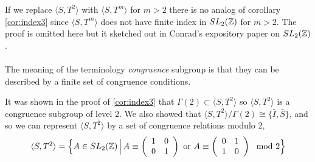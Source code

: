 If we replace $\langle S , T^2 \rangle$ with $\langle S, T^m \rangle$ for $m >2$ there is no analog of corollary \ref{cor:index3} since $\langle S, T^m \rangle$ does not have finite index in $SL_2(\mathbb{Z})$ for $m >2$. The proof is omitted here but it sketched out in Conrad's expository paper on $SL_2(\mathbb{Z})$ \citep{conrad}.
\\
\\
The meaning of the terminology \textit{congruence} subgroup is that they can be described by a finite set of congruence conditions.

\begin{example}
It was shown in the proof of \ref{cor:index3} that $\Gamma(2) \subset \langle S, T^2 \rangle$ so $\langle S, T^2 \rangle$ is a congruence subgroup of level 2. We also showed that $\langle S, T^2 \rangle  / \Gamma(2) \cong \{ \bar{I}, \bar{S} \}$, and so we can represent $\langle S, T^2 \rangle$ by a set of congruence relations modulo 2, 
$$\langle S, T^2 \rangle = \Big  \lbrace  A \in SL_2(\mathbb{Z})  \, \Big \vert \, A \equiv \left(\begin{array}{ c c } 1 & 0 \\ 0 & 1 \end{array} \right) \text{ or } A \equiv \left(\begin{array}{ c c } 0 & 1 \\ 1 & 0 \end{array} \right) \mod 2 \Big  \rbrace $$
\end{example}


